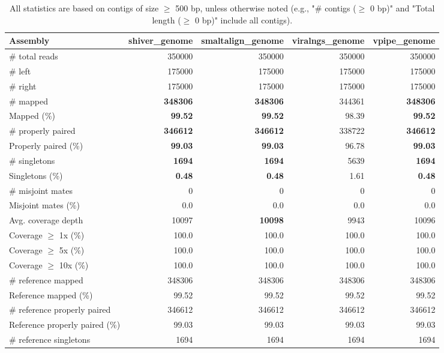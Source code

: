 \documentclass[12pt,a4paper]{article}
\begin{document}
\begin{table}[ht]
\begin{center}
\caption{All statistics are based on contigs of size $\geq$ 500 bp, unless otherwise noted (e.g., "\# contigs ($\geq$ 0 bp)" and "Total length ($\geq$ 0 bp)" include all contigs).}
\begin{tabular}{|l*{4}{|r}|}
\hline
Assembly & shiver\_genome & smaltalign\_genome & viralngs\_genome & vpipe\_genome \\ \hline
\# total reads & 350000 & 350000 & 350000 & 350000 \\ \hline
\# left & 175000 & 175000 & 175000 & 175000 \\ \hline
\# right & 175000 & 175000 & 175000 & 175000 \\ \hline
\# mapped & {\bf 348306} & {\bf 348306} & 344361 & {\bf 348306} \\ \hline
Mapped (\%) & {\bf 99.52} & {\bf 99.52} & 98.39 & {\bf 99.52} \\ \hline
\# properly paired & {\bf 346612} & {\bf 346612} & 338722 & {\bf 346612} \\ \hline
Properly paired (\%) & {\bf 99.03} & {\bf 99.03} & 96.78 & {\bf 99.03} \\ \hline
\# singletons & {\bf 1694} & {\bf 1694} & 5639 & {\bf 1694} \\ \hline
Singletons (\%) & {\bf 0.48} & {\bf 0.48} & 1.61 & {\bf 0.48} \\ \hline
\# misjoint mates & 0 & 0 & 0 & 0 \\ \hline
Misjoint mates (\%) & 0.0 & 0.0 & 0.0 & 0.0 \\ \hline
Avg. coverage depth & 10097 & {\bf 10098} & 9943 & 10096 \\ \hline
Coverage $\geq$ 1x (\%) & 100.0 & 100.0 & 100.0 & 100.0 \\ \hline
Coverage $\geq$ 5x (\%) & 100.0 & 100.0 & 100.0 & 100.0 \\ \hline
Coverage $\geq$ 10x (\%) & 100.0 & 100.0 & 100.0 & 100.0 \\ \hline
\# reference mapped & 348306 & 348306 & 348306 & 348306 \\ \hline
Reference mapped (\%) & 99.52 & 99.52 & 99.52 & 99.52 \\ \hline
\# reference properly paired & 346612 & 346612 & 346612 & 346612 \\ \hline
Reference properly paired (\%) & 99.03 & 99.03 & 99.03 & 99.03 \\ \hline
\# reference singletons & 1694 & 1694 & 1694 & 1694 \\ \hline

\end{tabular}
\end{center}
\end{table}
\end{document}
